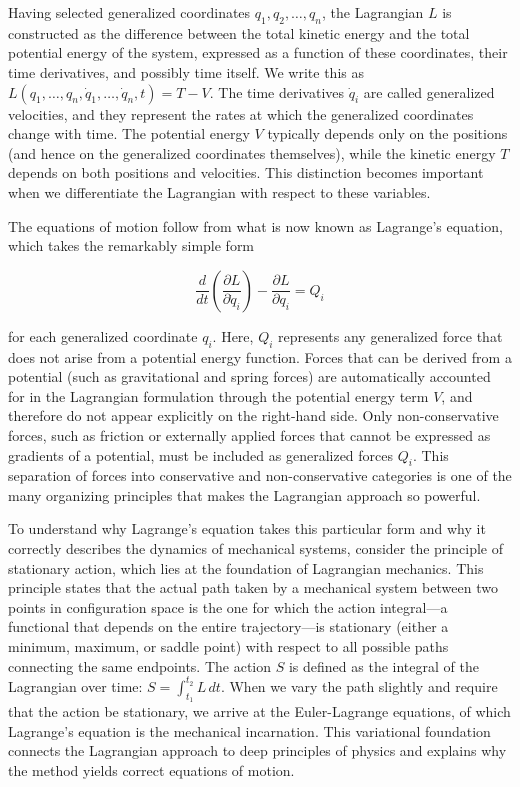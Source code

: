 Having selected generalized coordinates $q_1, q_2, \ldots, q_n$, the Lagrangian $L$ is constructed as the difference between the total kinetic energy and the total potential energy of the system, expressed as a function of these coordinates, their time derivatives, and possibly time itself. We write this as $L(q_1, \ldots, q_n, \dot{q}_1, \ldots, \dot{q}_n, t) = T - V$. The time derivatives $\dot{q}_i$ are called generalized velocities, and they represent the rates at which the generalized coordinates change with time. The potential energy $V$ typically depends only on the positions (and hence on the generalized coordinates themselves), while the kinetic energy $T$ depends on both positions and velocities. This distinction becomes important when we differentiate the Lagrangian with respect to these variables.

The equations of motion follow from what is now known as Lagrange's equation, which takes the remarkably simple form

$$\frac{d}{dt}\left(\frac{\partial L}{\partial \dot{q}_i}\right) - \frac{\partial L}{\partial q_i} = Q_i$$

for each generalized coordinate $q_i$. Here, $Q_i$ represents any generalized force that does not arise from a potential energy function. Forces that can be derived from a potential (such as gravitational and spring forces) are automatically accounted for in the Lagrangian formulation through the potential energy term $V$, and therefore do not appear explicitly on the right-hand side. Only non-conservative forces, such as friction or externally applied forces that cannot be expressed as gradients of a potential, must be included as generalized forces $Q_i$. This separation of forces into conservative and non-conservative categories is one of the many organizing principles that makes the Lagrangian approach so powerful.

To understand why Lagrange's equation takes this particular form and why it correctly describes the dynamics of mechanical systems, consider the principle of stationary action, which lies at the foundation of Lagrangian mechanics. This principle states that the actual path taken by a mechanical system between two points in configuration space is the one for which the action integral—a functional that depends on the entire trajectory—is stationary (either a minimum, maximum, or saddle point) with respect to all possible paths connecting the same endpoints. The action $S$ is defined as the integral of the Lagrangian over time: $S = \int_{t_1}^{t_2} L \, dt$. When we vary the path slightly and require that the action be stationary, we arrive at the Euler-Lagrange equations, of which Lagrange's equation is the mechanical incarnation. This variational foundation connects the Lagrangian approach to deep principles of physics and explains why the method yields correct equations of motion.

